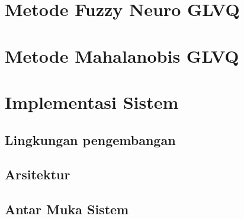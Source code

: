 \section{Metode Fuzzy Neuro GLVQ}


\section{Metode Mahalanobis GLVQ}


\section{Implementasi Sistem}
\subsection{Lingkungan pengembangan}

\subsection{Arsitektur}

\subsection{Antar Muka Sistem}
